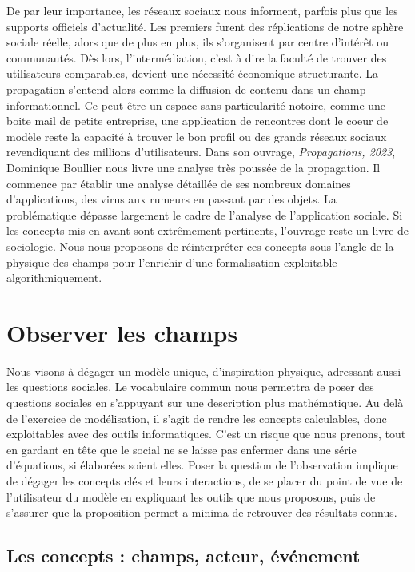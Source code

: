 \documentclass[11pt]{article}
\begin{document}
		De par leur importance, les réseaux sociaux nous informent, parfois plus que les supports officiels d'actualité. Les premiers furent des réplications de notre sphère sociale réelle, alors que de plus en plus, ils s'organisent par centre d'intérêt ou communautés. Dès lors, l'intermédiation, c'est à dire la faculté de trouver des utilisateurs comparables, devient une nécessité économique structurante. La propagation s'entend alors comme la diffusion de contenu dans un champ informationnel. Ce peut être un espace sans particularité notoire, comme une boite mail de petite entreprise, une application de rencontres dont le coeur de modèle reste la capacité à trouver \og{}le bon profil\fg{} ou des grands réseaux sociaux revendiquant des millions d'utilisateurs. Dans son ouvrage, \textit{Propagations, 2023}, Dominique Boullier nous livre une analyse très poussée de la propagation. Il commence par établir une analyse détaillée de ses nombreux domaines d'applications, des virus aux rumeurs en passant par des objets. La problématique dépasse largement le cadre de l'analyse de l'application sociale. Si les concepts mis en avant sont extrêmement pertinents, l'ouvrage reste un livre de sociologie. Nous nous proposons de réinterpréter ces concepts sous l'angle de la physique des champs pour l'enrichir d'une formalisation exploitable algorithmiquement. 
	
	\section{Observer les champs}
	
		Nous visons à dégager un modèle unique, d'inspiration physique, adressant aussi les questions sociales. Le vocabulaire commun nous permettra de poser des questions sociales en s'appuyant sur une description plus mathématique. Au delà de l'exercice de modélisation, il s'agit de rendre les concepts calculables, donc exploitables avec des outils informatiques. C'est un risque que nous prenons, tout en gardant en tête que le social ne se laisse pas enfermer dans une série d'équations, si élaborées soient elles. Poser la question de l'observation implique de dégager les concepts clés et leurs interactions, de se placer du point de vue de l'utilisateur du modèle en expliquant les outils que nous proposons, puis de s'assurer que la proposition permet a minima de retrouver des résultats connus. 
		
		\subsection{Les concepts : champs, acteur, événement}
		
\end{document}
